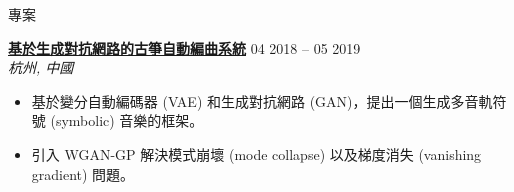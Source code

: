 \documentclass{resume}
\begin{document}
\vspace{-1em}
\begin{rSection}{專案}
\vspace{-1.25em}
    \item \textbf{\href{https://docs.google.com/presentation/d/1797idRRmgeD2JnUslGbflmGUO2X5lMY6/edit?usp=drive_link&ouid=101248488395326982475&rtpof=true&sd=true}{\textbf{\large{\underline{基於生成對抗網路的古箏自動編曲系統}}}}} \hfill {04 2018 -- 05 2019}\\
    \mbox{} \hfill \textit{杭州, 中國}
    \vspace{-0.5em}
    \begin{itemize}
        \item 基於變分自動編碼器 (VAE) 和生成對抗網路 (GAN)，提出一個生成多音軌符號 (symbolic) 音樂的框架。
        \item 引入 WGAN-GP 解決模式崩壞 (mode collapse) 以及梯度消失 (vanishing gradient) 問題。
    \end{itemize}

    


\end{rSection}
\end{document}
